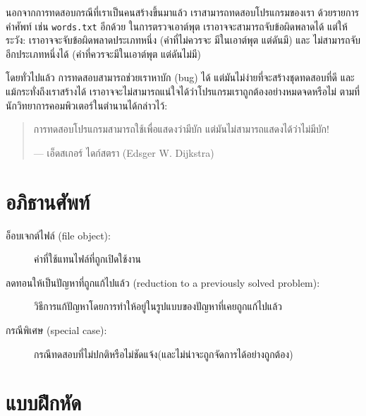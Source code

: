 นอกจากการทดสอบกรณีที่เราเป็นคนสร้างขึ้นมาแล้ว เราสามารถทดสอบโปรแกรมของเรา
ด้วยรายการคำศัพท์ เช่น {\tt words.txt} อีกด้วย ในการตรวจเอาต์พุต 
เราอาจจะสามารถจับข้อผิดพลาดได้  แต่ให้ระวัง: เราอาจจะจับข้อผิดพลาดประเภทหนึ่ง (คำที่ไม่ควรจะ
มีในเอาต์พุต แต่ดันมี) และ ไม่สามารถจับอีกประเภทหนึ่งได้ (คำที่ควรจะมีในเอาต์พุต แต่ดันไม่มี)

โดยทั่วไปแล้ว การทดสอบสามารถช่วยเราหาบัก (bug) ได้ แต่มันไม่ง่ายที่จะสร้างชุดทดสอบที่ดี
และแม้กระทั่งถึงเราสร้างได้ เราอาจจะไม่สามารถแน่ใจได้ว่าโปรแกรมเราถูกต้องอย่างหมดจดหรือไม่
ตามที่นักวิทยาการคอมพิวเตอร์ในตำนานได้กล่าวไว้:

\begin{quote}
การทดสอบโปรแกรมสามารถใช้เพื่อแสดงว่ามีบัก
แต่มันไม่สามารถแสดงได้ว่าไม่มีบัก!

--- เอ็ดสเกอร์ ไดก์สตรา (Edsger W. Dijkstra)
\end{quote}


\section{อภิธานศัพท์}

\begin{description}

\item[อ็อบเจกต์ไฟล์ (file object):] ค่าที่ใช้แทนไฟล์ที่ถูกเปิดใช้งาน

\item[ลดทอนให้เป็นปัญหาที่ถูกแก้ไปแล้ว (reduction to a previously solved problem):] 
วิธีการแก้ปัญหาโดยการทำให้อยู่ในรูปแบบของปัญหาที่เคยถูกแก้ไปแล้ว   

\item[กรณีพิเศษ (special case):] กรณีทดสอบที่ไม่ปกติหรือไม่ชัดแจ้ง(และไม่น่าจะถูกจัดการได้อย่างถูกต้อง)

\end{description}


\section{แบบฝึกหัด}

